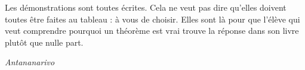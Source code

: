 Les démonstrations sont toutes écrites. Cela ne veut pas dire qu'elles doivent
toutes être faites au tableau : à vous de choisir. Elles sont là pour que
l'élève qui veut comprendre pourquoi un théorème est vrai trouve la réponse
dans son livre plutôt que nulle part.

\vspace{1.2em}
\noindent\textit{Antananarivo}
